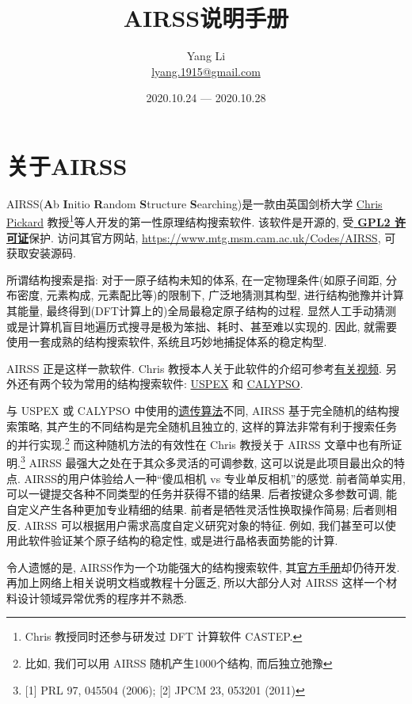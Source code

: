 \documentclass[a4paper, 10pt]{article}
\title{\textbf{AIRSS说明手册}}
\author{Yang Li\\ \href{mailto:lyang.1915@gmail.com}{lyang.1915@gmail.com}}
\date{2020.10.24 --- 2020.10.28}
\begin{document}
\maketitle
\tableofcontents

\newpage
\section{关于AIRSS}
AIRSS(\textbf{A}b \textbf{I}nitio \textbf{R}andom \textbf{S}tructure \textbf{S}earching)是一款由英国剑桥大学 \href{https://www.mtg.msm.cam.ac.uk/People/CJP}{Chris Pickard} 教授\footnote{Chris 教授同时还参与研发过 DFT 计算软件 CASTEP.}等人开发的第一性原理结构搜索软件. 该软件是开源的, 受\href{https://en.wikipedia.org/wiki/GNU_General_Public_License}{\textbf{ GPL2 许可证}}保护. 访问其官方网站, \url{https://www.mtg.msm.cam.ac.uk/Codes/AIRSS}, 可获取安装源码. 
  
所谓结构搜索是指: 对于一原子结构未知的体系, 在一定物理条件(如原子间距, 分布密度, 元素构成, 元素配比等)的限制下, 广泛地猜测其构型, 进行结构弛豫并计算其能量, 最终得到(DFT计算上的)全局最稳定原子结构的过程. 显然人工手动猜测或是计算机盲目地遍历式搜寻是极为笨拙、耗时、甚至难以实现的. 因此, 就需要使用一套成熟的结构搜索软件, 系统且巧妙地捕捉体系的稳定构型.

AIRSS 正是这样一款软件. Chris 教授本人关于此软件的介绍可参考\href{https://www.youtube.com/watch?v=xW6pOYEIKVs&t=1061s}{有关视频}. 另外还有两个较为常用的结构搜索软件: \href{http://uspex.stonybrook.edu/uspex.html}{USPEX} 和 \href{http://www.calypso.cn}{CALYPSO}.

与 USPEX 或 CALYPSO 中使用的\href{https://en.wikipedia.org/wiki/Genetic_algorithm}{遗传算法}不同, AIRSS 基于完全随机的结构搜索策略, 其产生的不同结构是完全随机且独立的, 这样的算法非常有利于搜索任务的并行实现.\footnote{比如, 我们可以用 AIRSS 随机产生1000个结构, 而后独立弛豫} 而这种随机方法的有效性在 Chris 教授关于 AIRSS 文章中也有所证明.\footnote{ [1] PRL 97, 045504 (2006); [2] JPCM 23, 053201 (2011)} AIRSS 最强大之处在于其众多灵活的可调参数, 这可以说是此项目最出众的特点. AIRSS的用户体验给人一种``傻瓜相机 vs 专业单反相机''的感觉. 前者简单实用, 可以一键提交各种不同类型的任务并获得不错的结果. 后者按键众多参数可调, 能自定义产生各种更加专业精细的结果. 前者是牺牲灵活性换取操作简易; 后者则相反. AIRSS 可以根据用户需求高度自定义研究对象的特征. 例如, 我们甚至可以使用此软件验证某个原子结构的稳定性, 或是进行晶格表面势能的计算.

令人遗憾的是, AIRSS作为一个功能强大的结构搜索软件, 其\href{https://airss-docs.github.io/technical-reference/buildcell-manual/}{官方手册}却仍待开发. 再加上网络上相关说明文档或教程十分匮乏, 所以大部分人对 AIRSS 这样一个材料设计领域异常优秀的程序并不熟悉. 
\end{document}
